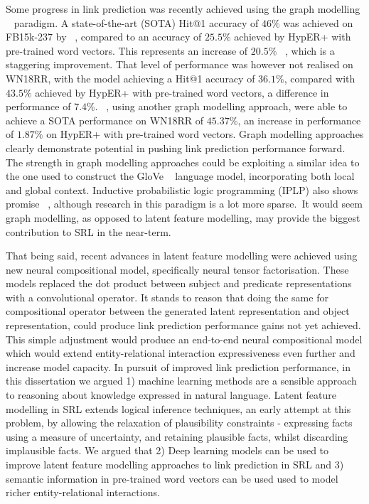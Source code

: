 \noindent Some progress in link prediction was recently achieved using the graph modelling \unskip ~\citep{Nickel_2016} paradigm. A state-of-the-art (SOTA) Hit@1 accuracy of $ 46\% $ was achieved on FB15k-237 by \unskip ~\citep{nathani2019learning}, compared to an accuracy of $ 25.5\% $ achieved by HypER+ with pre-trained word vectors. This represents an increase of $ 20.5 \% $ \unskip ~\citep{ruderNLPProg}, which is a staggering improvement. That level of performance was however not realised on WN18RR, with the model achieving a Hit@1 accuracy of $ 36.1\% $, compared with $ 43.5 \% $ achieved by HypER+ with pre-trained word vectors, a difference in performance of $ 7.4\% $. \unskip ~\citep{pinter-eisenstein-2018-predicting}, using another graph modelling approach, were able to achieve a SOTA performance on WN18RR of $ 45.37\% $, an increase in performance of $ 1.87\% $ on HypER+ with pre-trained word vectors. Graph modelling approaches clearly demonstrate potential in pushing link prediction performance forward. The strength in graph modelling approaches could be exploiting a similar idea to the one used to construct the GloVe \unskip ~\citep{pennington2014glove} language model, incorporating both local and global context. Inductive probabilistic logic programming (IPLP) also shows promise \unskip ~\citep{dong2019neural, manhaeve2018deepproblog}, although research in this paradigm is a lot more sparse.\ It would seem graph modelling, as opposed to latent feature modelling, may provide the biggest contribution to SRL in the near-term. \par

\noindent That being said, recent advances in latent feature modelling were achieved using new neural compositional model, specifically neural tensor factorisation. These models replaced the dot product between subject and predicate representations with a convolutional operator. It stands to reason that doing the same for compositional operator between the generated latent representation and object representation, could produce link prediction performance gains not yet achieved. This simple adjustment would produce an end-to-end neural compositional model which would extend entity-relational interaction expressiveness even further and increase model capacity. In pursuit of improved link prediction performance, in this dissertation we argued 1) machine learning methods are a sensible approach to reasoning about knowledge expressed in natural language. Latent feature modelling in SRL extends logical inference techniques, an early attempt at this problem, by allowing the relaxation of plausibility constraints - expressing facts using a measure of uncertainty, and retaining plausible facts, whilst discarding implausible facts. We argued that 2) Deep learning models can be used to improve latent feature modelling approaches to link prediction in SRL and 3) semantic information in pre-trained word vectors can be used used to model richer entity-relational interactions. \par

